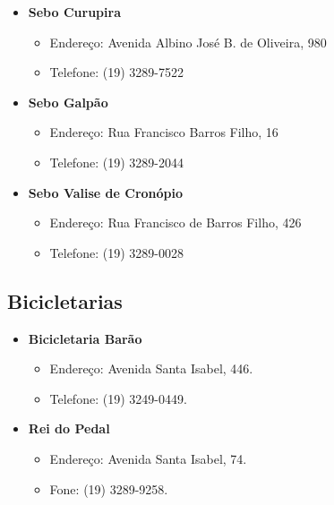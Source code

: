 \begin{itemize}
\item  \textbf{Sebo Curupira}
\begin{itemize}
\item  Endereço: Avenida Albino José B. de Oliveira, 980
\item  Telefone: (19) 3289-7522
\end{itemize}
\end{itemize}

\begin{itemize}
\item  \textbf{Sebo Galpão}
\begin{itemize}
\item  Endereço: Rua Francisco Barros Filho, 16
\item  Telefone: (19) 3289-2044
\end{itemize}
\end{itemize}

\begin{itemize}
\item  \textbf{Sebo Valise de Cronópio}
\begin{itemize}
\item  Endereço: Rua Francisco de Barros Filho, 426
\item  Telefone: (19) 3289-0028
\end{itemize}
\end{itemize}

\subsection{Bicicletarias}

\begin{itemize}
\item  \textbf{Bicicletaria Barão}
\begin{itemize}
\item  Endereço: Avenida Santa Isabel, 446.
\item  Telefone: (19) 3249-0449.
\end{itemize}
\end{itemize}

\begin{itemize}
\item  \textbf{Rei do Pedal}
\begin{itemize}
\item  Endereço: Avenida Santa Isabel, 74.
\item  Fone: (19) 3289-9258.
\end{itemize}
\end{itemize}

